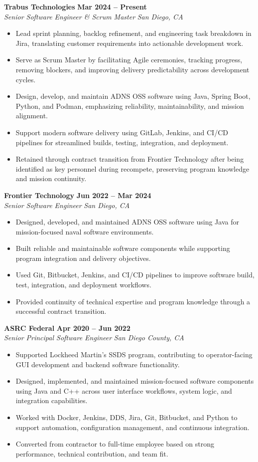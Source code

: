 \documentclass[10pt,letterpaper]{article}
\newcommand{\job}[4]{
  \textbf{#1} \hfill \textbf{#2} \\
  \textit{#3} \hfill \textit{#4}
}
\begin{document}
\job
  {Trabus Technologies}
  {Mar 2024 -- Present}
  {Senior Software Engineer \& Scrum Master}
  {San Diego, CA}

\begin{itemize}
  \item Lead sprint planning, backlog refinement, and engineering task breakdown in Jira, translating customer requirements into actionable development work.
  \item Serve as Scrum Master by facilitating Agile ceremonies, tracking progress, removing blockers, and improving delivery predictability across development cycles.
  \item Design, develop, and maintain ADNS OSS software using Java, Spring Boot, Python, and Podman, emphasizing reliability, maintainability, and mission alignment.
  \item Support modern software delivery using GitLab, Jenkins, and CI/CD pipelines for streamlined builds, testing, integration, and deployment.
  \item Retained through contract transition from Frontier Technology after being identified as key personnel during recompete, preserving program knowledge and mission continuity.
\end{itemize}

\job
  {Frontier Technology}
  {Jun 2022 -- Mar 2024}
  {Senior Software Engineer}
  {San Diego, CA}

\begin{itemize}
  \item Designed, developed, and maintained ADNS OSS software using Java for mission-focused naval software environments.
  \item Built reliable and maintainable software components while supporting program integration and delivery objectives.
  \item Used Git, Bitbucket, Jenkins, and CI/CD pipelines to improve software build, test, integration, and deployment workflows.
  \item Provided continuity of technical expertise and program knowledge through a successful contract transition.
\end{itemize}

\job
  {ASRC Federal}
  {Apr 2020 -- Jun 2022}
  {Senior Principal Software Engineer}
  {San Diego County, CA}

\begin{itemize}
  \item Supported Lockheed Martin's SSDS program, contributing to operator-facing GUI development and backend software functionality.
  \item Designed, implemented, and maintained mission-focused software components using Java and C++ across user interface workflows, system logic, and integration capabilities.
  \item Worked with Docker, Jenkins, DDS, Jira, Git, Bitbucket, and Python to support automation, configuration management, and continuous integration.
  \item Converted from contractor to full-time employee based on strong performance, technical contribution, and team fit.
\end{itemize}
\end{document}
